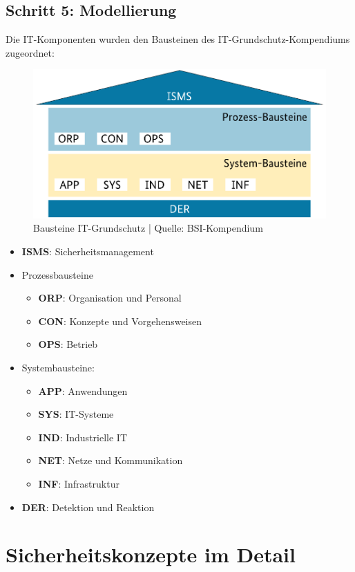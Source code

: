 \documentclass{orgstandard}
\begin{document}
\subsection{Schritt 5: Modellierung}
\label{sec:org1c9b1bc}
Die IT-Komponenten wurden den Bausteinen des IT-Grundschutz-Kompendiums zugeordnet:
\begin{figure}[!htpb]
\centering
\includegraphics[width=.65\linewidth]{img/IT-Grundbausteine.png}
\caption{Bausteine IT-Grundschutz | Quelle: BSI-Kompendium}
\end{figure}
\begin{NOTES}
\begin{itemize}
\item \textbf{ISMS}: Sicherheitsmanagement
\item Prozessbausteine
\begin{itemize}
\item \textbf{ORP}: Organisation und Personal
\item \textbf{CON}: Konzepte und Vorgehensweisen
\item \textbf{OPS}: Betrieb
\end{itemize}
\item Systembausteine:
\begin{itemize}
\item \textbf{APP}: Anwendungen
\item \textbf{SYS}: IT-Systeme
\item \textbf{IND}: Industrielle IT
\item \textbf{NET}: Netze und Kommunikation
\item \textbf{INF}: Infrastruktur
\end{itemize}
\item \textbf{DER}: Detektion und Reaktion
\end{itemize}
\end{NOTES}
\section{Sicherheitskonzepte im Detail}
\label{sec:org64590b7}
\end{document}
